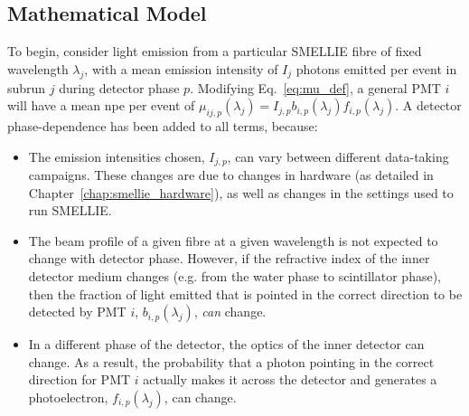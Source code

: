 \begin{figure}
    \centering
    \caption[]{}
    \label{fig:smellie_expected_ext_length_phases}
\end{figure}

\subsection{Mathematical Model}
To begin, consider light emission from a particular SMELLIE fibre of fixed wavelength $\lambda_{j}$, with a mean emission intensity of $I_{j}$ photons emitted per event in subrun $j$ during detector phase $p$. Modifying Eq.~\ref{eq:mu_def}, a general PMT $i$ will have a mean npe per event of $\mu_{ij,p}(\lambda_{j}) = I_{j,p}b_{i,p}(\lambda_{j})f_{i,p}(\lambda_{j})$. A detector phase-dependence has been added to all terms, because:
\begin{itemize}
    \item The emission intensities chosen, $I_{j,p}$, can vary between different data-taking campaigns. These changes are due to changes in hardware (as detailed in Chapter~\ref{chap:smellie_hardware}), as well as changes in the settings used to run SMELLIE.
    \item The beam profile of a given fibre at a given wavelength is not expected to change with detector phase. However, if the refractive index of the inner detector medium changes (e.g. from the water phase to scintillator phase), then the fraction of light emitted that is pointed in the correct direction to be detected by PMT $i$, $b_{i,p}(\lambda_{j})$, \textit{can} change.
    \item In a different phase of the detector, the optics of the inner detector can change. As a result, the probability that a photon pointing in the correct direction for PMT $i$ actually makes it across the detector and generates a photoelectron, $f_{i,p}(\lambda_{j})$, can change.
\end{itemize}

\begin{figure}
    \centering
    \caption[]{}
    \label{fig:smellie_ext_length_schematic}
\end{figure}

